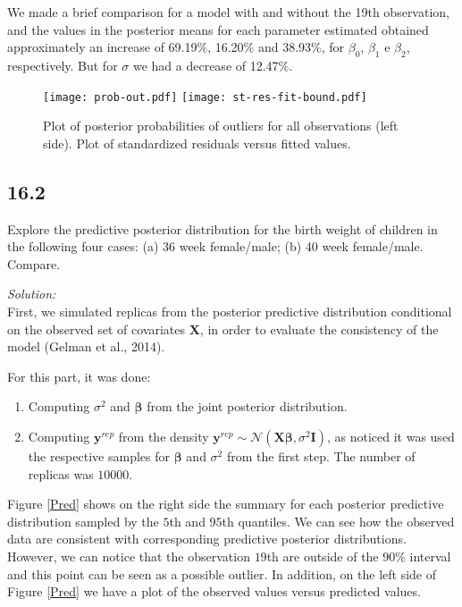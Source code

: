\documentclass[a4paper, 11pt]{article}
\begin{document}
We made a brief comparison for a model with and without the 19th observation, and the values in the posterior means for each parameter estimated obtained approximately an increase of 69.19\%, 16.20\% and 38.93\%, for $\beta_0$, $\beta_1$ e $\beta_2$, respectively. But for $\sigma$ we had a decrease of 12.47\%.

\begin{figure}[H]
\centering
\texttt{[image: prob-out.pdf]} 
\texttt{[image: st-res-fit-bound.pdf]} 
\caption{Plot of posterior probabilities of outliers for all observations (left side). Plot of standardized residuals versus fitted values.}
\label{residuals}
\end{figure}


\subsection*{16.2} Explore the predictive posterior distribution for the birth weight of children in the following four cases: (a) 36 week female/male; (b) 40 week female/male. Compare.

\noindent
\textit{Solution:}\\

First, we simulated replicas from the posterior predictive distribution conditional on the observed set of covariates $\textbf{X}$, in order to evaluate the consistency of the model (Gelman et al., 2014).

For this part, it was done:
\begin{enumerate}
\item Computing $\sigma^2$ and $\boldsymbol{\beta}$ from the joint posterior distribution.
\item Computing $\textbf{y}^{rep}$ from the density $\textbf{y}^{rep} \sim \mathcal{N}(\textbf{X}\boldsymbol{\beta}, \sigma^2\textbf{I})$, as noticed it was used the respective samples for $\boldsymbol{\beta}$ and $\sigma^2$ from the first step. The number of replicas was $10000$.
\end{enumerate}

Figure \ref{Pred} shows on the right side the summary for each posterior predictive distribution sampled by the $5$th and $95$th quantiles. We can see how the observed data are consistent with corresponding predictive posterior distributions. However, we can notice that the observation $19$th are outside of the $90$\% interval and this point can be seen as a possible outlier. In addition, on the left side of Figure \ref{Pred} we have a plot of the observed values versus predicted values.
\end{document}
